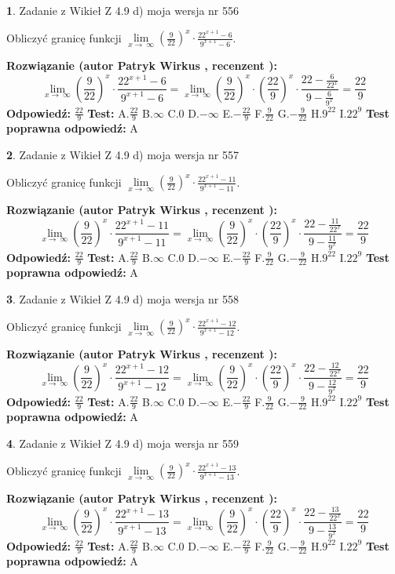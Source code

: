\documentclass[12pt, a4paper]{article}
\theoremstyle{definition} %
\newtheorem{zad}{}
\newcommand{\zadStart}[1]{\begin{zad}#1\newline}
\newcommand{\zadStop}{\end{zad}}
\newcommand{\rozwStart}[2]{\noindent \textbf{Rozwiązanie (autor #1 , recenzent #2): }\newline}
\newcommand{\rozwStop}{\newline}
\newcommand{\odpStart}{\noindent \textbf{Odpowiedź:}\newline}
\newcommand{\odpStop}{\newline}
\newcommand{\testStart}{\noindent \textbf{Test:}\newline}
\newcommand{\testStop}{\newline}
\newcommand{\kluczStart}{\noindent \textbf{Test poprawna odpowiedź:}\newline}
\newcommand{\kluczStop}{\newline}
\begin{document}
\zadStart{Zadanie z Wikieł Z 4.9 d) moja wersja nr 556}


Obliczyć granicę funkcji  $\lim\limits_{x\to\ \infty}(\frac{9}{22})^{x}\cdot\frac{22^{x+1}-6}{9^{x+1}-6}$.
\zadStop
\rozwStart{Patryk Wirkus}{}
$$\lim\limits_{x\to\ \infty}(\frac{9}{22})^{x}\cdot\frac{22^{x+1}-6}{9^{x+1}-6}=\lim\limits_{x\to\ \infty}(\frac{9}{22})^{x}\cdot(\frac{22}{9})^{x} \cdot \frac{22-\frac{6}{22^{x}}}{9-\frac{6}{9^{x}}} = \frac{22}{9}$$
\rozwStop
\odpStart
$\frac{22}{9}$
\odpStop
\testStart
A.$\frac{22}{9}$ B.$\infty$ C.$0$ D.$-\infty$ E.$-\frac{22}{9}$
F.$\frac{9}{22}$ G.$-\frac{9}{22}$
H.$9^{22}$
I.$22^{9}$
\testStop
\kluczStart
A
\kluczStop



\zadStart{Zadanie z Wikieł Z 4.9 d) moja wersja nr 557}


Obliczyć granicę funkcji  $\lim\limits_{x\to\ \infty}(\frac{9}{22})^{x}\cdot\frac{22^{x+1}-11}{9^{x+1}-11}$.
\zadStop
\rozwStart{Patryk Wirkus}{}
$$\lim\limits_{x\to\ \infty}(\frac{9}{22})^{x}\cdot\frac{22^{x+1}-11}{9^{x+1}-11}=\lim\limits_{x\to\ \infty}(\frac{9}{22})^{x}\cdot(\frac{22}{9})^{x} \cdot \frac{22-\frac{11}{22^{x}}}{9-\frac{11}{9^{x}}} = \frac{22}{9}$$
\rozwStop
\odpStart
$\frac{22}{9}$
\odpStop
\testStart
A.$\frac{22}{9}$ B.$\infty$ C.$0$ D.$-\infty$ E.$-\frac{22}{9}$
F.$\frac{9}{22}$ G.$-\frac{9}{22}$
H.$9^{22}$
I.$22^{9}$
\testStop
\kluczStart
A
\kluczStop



\zadStart{Zadanie z Wikieł Z 4.9 d) moja wersja nr 558}


Obliczyć granicę funkcji  $\lim\limits_{x\to\ \infty}(\frac{9}{22})^{x}\cdot\frac{22^{x+1}-12}{9^{x+1}-12}$.
\zadStop
\rozwStart{Patryk Wirkus}{}
$$\lim\limits_{x\to\ \infty}(\frac{9}{22})^{x}\cdot\frac{22^{x+1}-12}{9^{x+1}-12}=\lim\limits_{x\to\ \infty}(\frac{9}{22})^{x}\cdot(\frac{22}{9})^{x} \cdot \frac{22-\frac{12}{22^{x}}}{9-\frac{12}{9^{x}}} = \frac{22}{9}$$
\rozwStop
\odpStart
$\frac{22}{9}$
\odpStop
\testStart
A.$\frac{22}{9}$ B.$\infty$ C.$0$ D.$-\infty$ E.$-\frac{22}{9}$
F.$\frac{9}{22}$ G.$-\frac{9}{22}$
H.$9^{22}$
I.$22^{9}$
\testStop
\kluczStart
A
\kluczStop



\zadStart{Zadanie z Wikieł Z 4.9 d) moja wersja nr 559}


Obliczyć granicę funkcji  $\lim\limits_{x\to\ \infty}(\frac{9}{22})^{x}\cdot\frac{22^{x+1}-13}{9^{x+1}-13}$.
\zadStop
\rozwStart{Patryk Wirkus}{}
$$\lim\limits_{x\to\ \infty}(\frac{9}{22})^{x}\cdot\frac{22^{x+1}-13}{9^{x+1}-13}=\lim\limits_{x\to\ \infty}(\frac{9}{22})^{x}\cdot(\frac{22}{9})^{x} \cdot \frac{22-\frac{13}{22^{x}}}{9-\frac{13}{9^{x}}} = \frac{22}{9}$$
\rozwStop
\odpStart
$\frac{22}{9}$
\odpStop
\testStart
A.$\frac{22}{9}$ B.$\infty$ C.$0$ D.$-\infty$ E.$-\frac{22}{9}$
F.$\frac{9}{22}$ G.$-\frac{9}{22}$
H.$9^{22}$
I.$22^{9}$
\testStop
\kluczStart
A
\kluczStop
\end{document}
